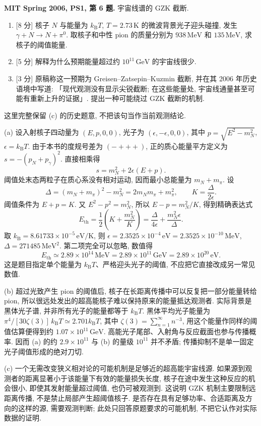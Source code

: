\begin{exercise}
\textbf{MIT Spring 2006, PS1, 第 6 题.} 宇宙线谱的 GZK 截断.
\begin{enumerate}[label=(\alph*)]
\item \textnormal{[8 分]} 核子 $N$ 与能量为 $k_{\mathrm B}T$, $T=2.73\,\mathrm K$ 的微波背景光子迎头碰撞, 发生 $\gamma+N\to N+\pi^0$. 取核子和中性 pion 的质量分别为 $938\,\mathrm{MeV}$ 和 $135\,\mathrm{MeV}$, 求核子的阈值能量.
\item \textnormal{[5 分]} 解释为什么预期能量超过约 $10^{11}\,\mathrm{GeV}$ 的宇宙线很少.
\item \textnormal{[3 分]} 原稿称这一预期为 Greisen--Zatsepin--Kuzmin 截断, 并在其 2006 年历史语境中写道: 「现代观测没有显示尖锐截断; 在这些能量处, 宇宙线通量甚至可能有重新上升的证据」. 提出一种可能绕过 GZK 截断的机制.
\end{enumerate}
这里完整保留 (c) 的历史题意, 不把该句当作当前观测结论.
\end{exercise}
\begin{solution}
(a) 设入射核子四动量为 $(E,p,0,0)$, 光子为 $(\epsilon,-\epsilon,0,0)$, 其中 $p=\sqrt{E^2-m_N^2}$, $\epsilon=k_{\mathrm B}T$. 由于本书的度规号差为 $(-+++)$, 正的质心能量平方定义为 $s=-(p_N+p_\gamma)^2$. 直接相乘得
\[
 s=m_N^2+2\epsilon(E+p).
\]
阈值处末态两粒子在质心系没有相对运动, 因而最小总能量为 $m_N+m_\pi$. 设
\[
 \Delta=(m_N+m_\pi)^2-m_N^2=2m_Nm_\pi+m_\pi^2,
 \qquad K=\frac{\Delta}{2\epsilon}.
\]
阈值条件为 $E+p=K$. 又 $E^2-p^2=m_N^2$, 所以 $E-p=m_N^2/K$, 得到精确表达式
\[
 E_{\mathrm{th}}=\frac12\left(K+\frac{m_N^2}{K}\right)
 =\frac{\Delta}{4\epsilon}+\frac{m_N^2\epsilon}{\Delta}.
\]
取 $k_{\mathrm B}=8.61733\times10^{-5}\,\mathrm{eV/K}$, 则 $\epsilon=2.3525\times10^{-4}\,\mathrm{eV}=2.3525\times10^{-10}\,\mathrm{MeV}$, $\Delta=271485\,\mathrm{MeV}^2$. 第二项完全可以忽略, 数值得
\[
 E_{\mathrm{th}}\simeq2.89\times10^{14}\,\mathrm{MeV}
 =2.89\times10^{11}\,\mathrm{GeV}=2.89\times10^{20}\,\mathrm{eV}.
\]
这是题目指定单个能量为 $k_{\mathrm B}T$、严格迎头光子的阈值, 不应把它直接改成另一常见数值.

(b) 超过光致产生 pion 的阈值后, 核子在长距离传播中可以反复把一部分能量转给 pion, 所以很远处发出的超高能核子难以保持原来的能量抵达观测者. 实际背景是黑体光子谱, 并非所有光子的能量都等于 $k_{\mathrm B}T$. 黑体平均光子能量为 $\pi^4/[30\zeta(3)]\,k_{\mathrm B}T\simeq2.701k_{\mathrm B}T$, 其中 $\zeta(3)=\sum_{n=1}^\infty n^{-3}$, 用这个能量作同样的阈值估算便得到约 $1.07\times10^{11}\,\mathrm{GeV}$. 高能光子尾部、入射角与反应截面也参与传播概率. 因而 (a) 的约 $2.9\times10^{11}$ 与 (b) 的量级 $10^{11}$ 并不矛盾; 传播抑制不是单一固定光子阈值形成的绝对刀切.

(c) 一个无需改变狭义相对论的可能机制是足够近的超高能宇宙线源. 如果源到观测者的距离显著小于该能量下有效的能量损失长度, 核子在途中发生这种反应的机会很小, 即使其发射能量超过阈值, 也仍可被观测到. 这说明 GZK 机制主要限制远距离传播, 不是禁止局部产生超阈值核子. 是否存在具有足够功率、合适距离及方向的这样的源, 需要观测判断; 此处只回答原题要求的可能机制, 不把它认作对实际数据的证明.
\end{solution}

